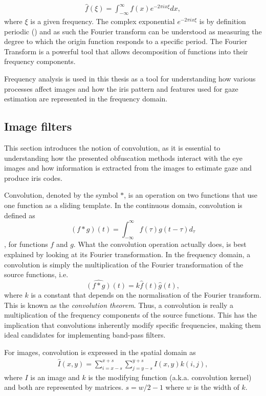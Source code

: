 \begin{align}\label{eq:conv}
	\hat{f}(\xi) = \int_{-\infty}^{\infty} f(x) e^{-2\pi i x\xi}dx,
\end{align}
where $\xi$ is a given frequency. The complex exponential $e^{-2\pi i x\xi}$ is by definition periodic () and as such the Fourier transform can be understood as measuring the degree to which the origin function responds to a specific period. The Fourier Transform is a powerful tool that allows decomposition of functions into their frequency components. 

Frequency analysis is used in this thesis as a tool for understanding how various processes affect images and how the iris pattern and features used for gaze estimation are represented in the frequency domain.

\subsection{Image filters}
This section introduces the notion of convolution, as it is essential to understanding how the presented obfuscation methods interact with the eye images and how information is extracted from the images to estimate gaze and produce iris codes.

Convolution, denoted by the symbol $*$, is an operation on two functions that use one function as a sliding template. In the continuous domain, convolution is defined as
\begin{equation}
    (f*g)(t) = \int_{-\infty}^\infty f(\tau)g(t-\tau)d_\tau
\end{equation},
for functions $f$ and $g$. 
What the convolution operation actually does, is best explained by looking at its Fourier transformation. In the frequency domain, a convolution is simply the multiplication of the Fourier transformation of the source functions, i.e.
\begin{equation}
    \widehat{(f*g)}(t) = k\hat{f}(t)\hat{g}(t),
\end{equation}
where $k$ is a constant that depends on the normalisation of the Fourier transform. This is known as the \emph{convolution theorem}. Thus, a convolution is really a multiplication of the frequency components of the source functions. This has the implication that convolutions inherently modify specific frequencies, making them ideal candidates for implementing band-pass filters. 

For images, convolution is expressed in the spatial domain as
\begin{align}
    \hat{I}(x, y) = \sum_{i=x-s}^{x+s}\sum_{j=y-s}^{y+s} I(x,y)k(i,j),
\end{align}
where $I$ is an image and $k$ is the modifying function (a.k.a. convolution kernel) and both are represented by matrices. $s=w/2 -1$ where $w$ is the width of $k$.


